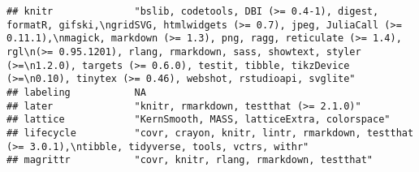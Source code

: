 \documentclass[
]{article}
\begin{document}
\begin{verbatim}
## knitr              "bslib, codetools, DBI (>= 0.4-1), digest, formatR, gifski,\ngridSVG, htmlwidgets (>= 0.7), jpeg, JuliaCall (>= 0.11.1),\nmagick, markdown (>= 1.3), png, ragg, reticulate (>= 1.4), rgl\n(>= 0.95.1201), rlang, rmarkdown, sass, showtext, styler (>=\n1.2.0), targets (>= 0.6.0), testit, tibble, tikzDevice (>=\n0.10), tinytex (>= 0.46), webshot, rstudioapi, svglite"                                                                                                       
## labeling           NA                                                                                                                                                                                                                                                                                                                                                                                                                                                                                
## later              "knitr, rmarkdown, testthat (>= 2.1.0)"                                                                                                                                                                                                                                                                                                                                                                                                                                           
## lattice            "KernSmooth, MASS, latticeExtra, colorspace"                                                                                                                                                                                                                                                                                                                                                                                                                                      
## lifecycle          "covr, crayon, knitr, lintr, rmarkdown, testthat (>= 3.0.1),\ntibble, tidyverse, tools, vctrs, withr"                                                                                                                                                                                                                                                                                                                                                                             
## magrittr           "covr, knitr, rlang, rmarkdown, testthat"                                                                                                                                                                                                                                                                                                                                                                                                                                         

\end{verbatim}
\end{document}
